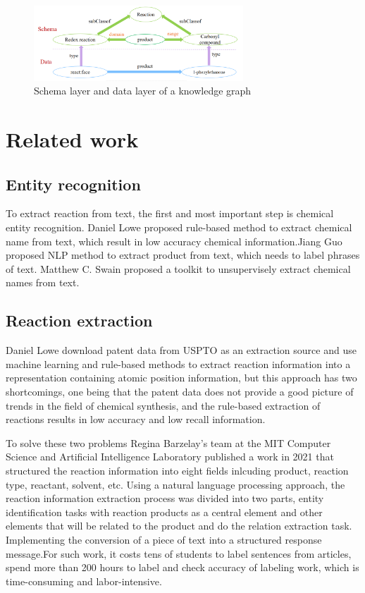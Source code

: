 \documentclass[%
 aip,
 jmp,%
 amsmath,amssymb,
 reprint,%
]{revtex4-2}
\begin{document}
\begin{figure}[htbp]
 \centering
 \includegraphics[width=0.7\textwidth]{figure/3.png}
 \caption{ Schema layer and data layer of a knowledge graph }
 \label{ Fig.3 }
\end{figure}


\section{Related work}

\subsection{Entity recognition}
To extract reaction from text, the first and most important step is chemical entity recognition.
Daniel Lowe proposed rule-based method to extract chemical name from text, which result in low accuracy chemical
information.Jiang Guo proposed NLP method to extract product from text, which needs to label phrases of text. 
Matthew C. Swain proposed a toolkit to unsupervisely extract chemical names from text.

\subsection{Reaction extraction}
Daniel Lowe download patent data from USPTO as an extraction source and use machine learning and rule-based 
methods to extract reaction information into a representation containing atomic position information, 
but this approach has two shortcomings, one being that the patent data does not provide a good picture 
of trends in the field of chemical synthesis, and the rule-based extraction of reactions results in 
low accuracy and low recall information.

To solve these two problems Regina Barzelay's team at the MIT Computer Science and Artificial Intelligence Laboratory published a work 
in 2021 that structured the reaction information into eight fields inlcuding product, reaction type, reactant, solvent, etc. Using a 
natural language processing approach, the reaction information extraction process was divided into two parts, entity identification tasks
with reaction products as a central element and other elements that will be related to the product and do the relation extraction task.
Implementing the conversion of a piece of text into a structured response message.For such work, it costs tens of students to label sentences
from articles, spend more than 200 hours to label and check accuracy of labeling work, which is time-consuming and labor-intensive.
\end{document}
